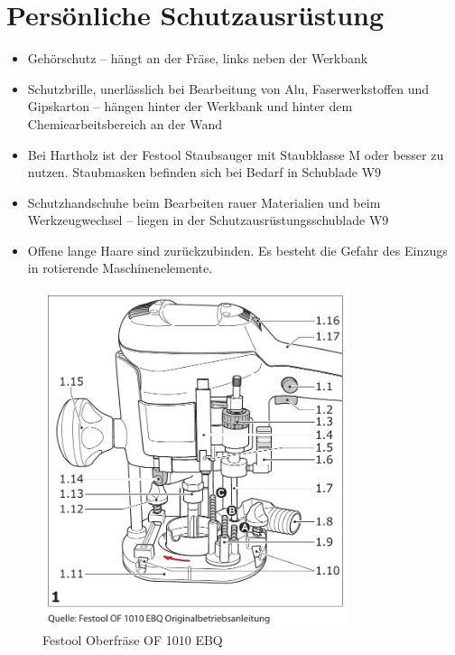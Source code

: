 \documentclass{\basedir/fablab-document}
\begin{document}
\section{Persönliche Schutzausrüstung}
\begin{itemize}
\item Gehörschutz -- hängt an der Fräse, links neben der Werkbank
\item Schutzbrille, unerlässlich bei Bearbeitung von Alu, Faserwerkstoffen und Gipskarton -- hängen hinter der Werkbank und hinter dem Chemiearbeitsbereich an der Wand
\item Bei Hartholz ist der Festool Staubsauger mit Staubklasse M oder besser zu nutzen. Staubmasken befinden sich bei Bedarf in Schublade W9
\item Schutzhandschuhe beim Bearbeiten rauer Materialien und beim Werkzeugwechsel -- liegen in der Schutzausrüstungsschublade W9
\item Offene lange Haare sind zurückzubinden. Es besteht die Gefahr des Einzugs in rotierende Maschinenelemente.

\end{itemize}

\begin{figure}[h!]
    \centering
    \includegraphics[width=0.8\textwidth]{bilder/oberfraese-sketch}
    \caption{Festool Oberfräse OF 1010 EBQ}
    \label{fig:sketch}
\end{figure}
\end{document}
